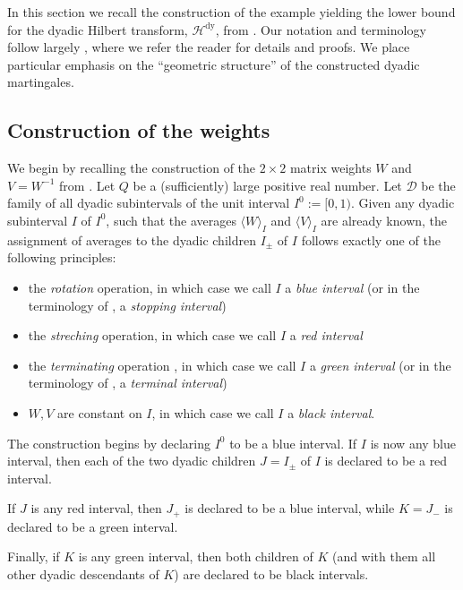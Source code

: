 \documentclass{amsart}
\newcommand{\cD}{\mathcal{D}}
\theoremstyle{definition}
\theoremstyle{remark}
\begin{document}
In this section we recall the construction of the example yielding the lower bound for the dyadic Hilbert transform, $\mathcal{H}^{\mathrm{dy}}$, from \cite{DoPeTrVo}.  Our notation and terminology follow largely \cite{DoPeTrVo}, where we refer the reader for details and proofs. We place particular emphasis on the ``geometric structure'' of the constructed dyadic martingales.

\subsection{Construction of the weights}

We begin by recalling the construction of the $2\times 2$ matrix weights $W$ and $V=W^{-1}$ from \cite[Section 4]{DoPeTrVo}. Let $Q$ be a (sufficiently) large positive real number. Let $\cD$ be the family of all dyadic subintervals of the unit interval $I^{0}:=[0,1)$. Given any dyadic subinterval $I$ of $I^{0}$, such that the averages $\langle W\rangle_{I}$ and $\langle V\rangle_{I}$ are already known, the assignment of averages to the dyadic children $I_{\pm}$ of $I$ follows exactly one of the following principles:
\begin{itemize}
    \item the \emph{rotation} operation, in which case we call $I$ a \emph{blue interval} (or in the terminology of \cite{DoPeTrVo}, a \emph{stopping interval})
    \item the \emph{streching} operation, in which case we call $I$ a \emph{red interval}
    \item the \emph{terminating} operation \cite[Lemma 3.4]{DoPeTrVo}, in which case we call $I$ a \emph{green interval} (or in the terminology of \cite{DoPeTrVo}, a \emph{terminal interval})
    \item $W,V$ are constant on $I$, in which case we call $I$ a \emph{black interval}.
\end{itemize}

The construction begins by declaring $I^{0}$ to be a blue interval. If $I$ is now any blue interval, then each of the two dyadic children $J=I_{\pm}$ of $I$ is declared to be a red interval.

If $J$ is any red interval, then $J_{+}$ is declared to be a blue interval, while $K=J_{-}$ is declared to be a green interval.

Finally, if $K$ is any green interval, then both children of $K$ (and with them all other dyadic descendants of $K$) are declared to be black intervals.
\end{document}
